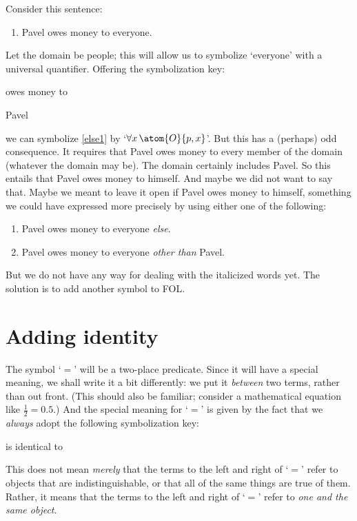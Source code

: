 Consider this sentence:
\begin{enumerate}
\item\label{else1} Pavel owes money to everyone.
\end{enumerate}
Let the domain be people; this will allow us to symbolize `everyone' with a universal quantifier. Offering the symbolization key:
	\begin{ekey}
		\item[\atom{O}{x,y}]  owes money to 
		\item[p] Pavel
	\end{ekey}
we can symbolize \cref*{else1} by `$\forall x\, \atom{O}{p,x}$'. But this has a (perhaps) odd consequence. It requires that Pavel owes money to every member of the domain (whatever the domain may be). The domain certainly includes Pavel. So this entails that Pavel owes money to himself. And maybe we did not want to say that. Maybe we meant to leave it open if Pavel owes money to himself, something we could have expressed more precisely by using either one of the following:
	\begin{enumerate}
		\item\label{else1b} Pavel owes money to everyone \emph{else}.
		\item\label{else1c} Pavel owes money to everyone \emph{other than} Pavel.
	\end{enumerate}
But we do not have any way for dealing with the italicized words yet. The solution is to add another symbol to FOL.

\section{Adding identity}

The symbol `$=$' will be a two-place predicate. Since it will have a special meaning, we shall write it a bit differently: we put it \emph{between} two terms, rather than out front. (This should also be familiar; consider a mathematical equation like $\frac{1}{2} = 0.5$.) And the special meaning for `$=$' is given by the fact that we \emph{always} adopt the following symbolization key: 
	\begin{ekey}
		\item[{x=y}]  is identical to \gap{y}
	\end{ekey}
This does not mean \emph{merely} that the terms to the left and right
of `$=$' refer to objects that are indistinguishable, or that all of
the same things are true of them. Rather, it means that the terms to
the left and right of `$=$' refer to \emph{one and the same object}.


